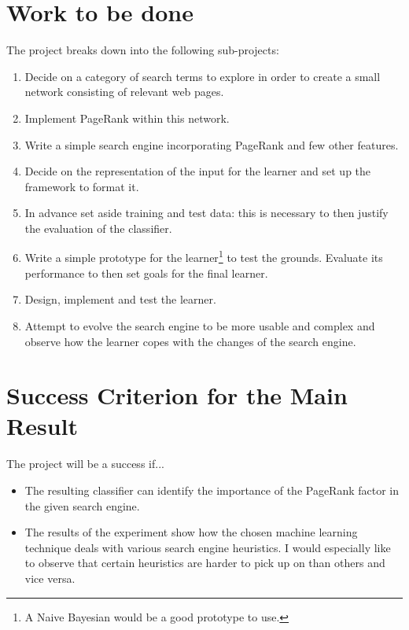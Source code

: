 \section*{\bf Work to be done}

The project breaks down into the following sub-projects:

\begin{enumerate}
\item Decide on a category of search terms to explore in order to create a small network consisting of relevant web pages.

\item Implement PageRank within this network. 

\item Write a simple search engine incorporating PageRank and few other features. 

\item Decide on the representation of the input for the learner and set up the framework to format it. 

\item In advance set aside training and test data: this is necessary to then justify the evaluation of the classifier.

\item Write a simple prototype for the learner\footnote {A Naive Bayesian would be a good prototype to use.} to test the grounds. Evaluate its performance to then set goals for the final learner.  

\item Design, implement and test the learner. 

\item Attempt to evolve the search engine to be more usable and complex and observe how the learner copes with the changes of the search engine. 


\end{enumerate}

\section*{\bf Success Criterion for the Main Result}


The project will be a success if... 
\begin{itemize}
\item The resulting classifier can identify the importance of the PageRank factor in the given search engine.
\item The results of the experiment show how the chosen machine learning technique deals with various search engine heuristics. I would especially like to observe that certain heuristics are harder to pick up on than others and vice versa.
\end{itemize}
